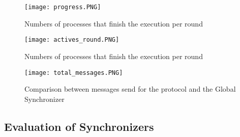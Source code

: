 \begin{figure}[ht]
\centering
\texttt{[image: progress.PNG]} 
\caption{Numbers of processes that finish the execution per round}
\label{fig:progression}
\end{figure}

\begin{figure}[ht]
\centering
\texttt{[image: actives\_round.PNG]} 
\caption{Numbers of processes that finish the execution per round}
\label{fig:actives}
\end{figure}


\begin{figure}[ht]
\centering
\texttt{[image: total\_messages.PNG]} 
\caption{Comparison between messages send for the protocol and the Global Synchronizer}
\label{fig:total_msg}
\end{figure}



\subsection{Evaluation of Synchronizers}